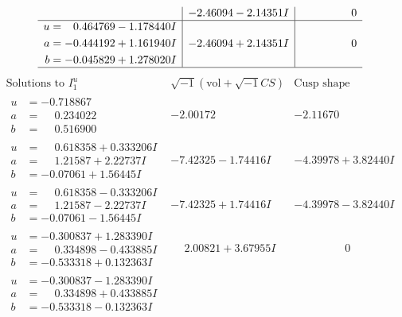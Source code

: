 \documentclass[1p]{elsarticle_modified}
\theoremstyle{definition}
\newcommand{\I}{\sqrt{-1}}
\begin{document}
$$\begin{array}{c|c|c}
 & -2.46094 - 2.14351 I & \phantom{-0.000000 } 0 \\ \hline\begin{aligned}
u &= \phantom{-}0.464769 - 1.178440 I \\
a &= -0.444192 + 1.161940 I \\
b &= -0.045829 + 1.278020 I\end{aligned}
 & -2.46094 + 2.14351 I & \phantom{-0.000000 } 0\\
 \hline 
 \end{array}$$\newpage$$\begin{array}{c|c|c}  
\text{Solutions to }I^u_{1}& \I (\text{vol} + \sqrt{-1}CS) & \text{Cusp shape}\\
 \hline 
\begin{aligned}
u &= -0.718867\phantom{ +0.000000I} \\
a &= \phantom{-}0.234022\phantom{ +0.000000I} \\
b &= \phantom{-}0.516900\phantom{ +0.000000I}\end{aligned}
 & -2.00172\phantom{ +0.000000I} & -2.11670\phantom{ +0.000000I} \\ \hline\begin{aligned}
u &= \phantom{-}0.618358 + 0.333206 I \\
a &= \phantom{-}1.21587 + 2.22737 I \\
b &= -0.07061 + 1.56445 I\end{aligned}
 & -7.42325 - 1.74416 I & -4.39978 + 3.82440 I \\ \hline\begin{aligned}
u &= \phantom{-}0.618358 - 0.333206 I \\
a &= \phantom{-}1.21587 - 2.22737 I \\
b &= -0.07061 - 1.56445 I\end{aligned}
 & -7.42325 + 1.74416 I & -4.39978 - 3.82440 I \\ \hline\begin{aligned}
u &= -0.300837 + 1.283390 I \\
a &= \phantom{-}0.334898 - 0.433885 I \\
b &= -0.533318 + 0.132363 I\end{aligned}
 & \phantom{-}2.00821 + 3.67955 I & \phantom{-0.000000 } 0 \\ \hline\begin{aligned}
u &= -0.300837 - 1.283390 I \\
a &= \phantom{-}0.334898 + 0.433885 I \\
b &= -0.533318 - 0.132363 I\end{aligned}

\end{array}$$
\end{document}
